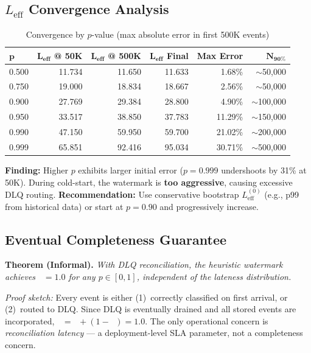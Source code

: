\documentclass[11pt,a4paper]{article}
\DeclareMathOperator{\Cimm}{C_{\text{imm}}}
\DeclareMathOperator{\Cev}{C_{\text{ev}}}
\newcommand{\Leff}{L_{\text{eff}}}
\begin{document}
\subsection{$\Leff$ Convergence Analysis}

\begin{table}[H]
\centering
\caption{Convergence by $p$-value (max absolute error in first 500K events)}
\label{tab:convergence}
\begin{tabular}{lrrrrr}
\toprule
$\bm{p}$ & $\mathbf{L_{\textbf{eff}}}$ \textbf{@ 50K} & $\mathbf{L_{\textbf{eff}}}$ \textbf{@ 500K} & $\mathbf{L_{\textbf{eff}}}$ \textbf{Final} & \textbf{Max Error} & $\mathbf{N_{90\%}}$ \\
\midrule
0.500 & 11.734 & 11.650 & 11.633 & 1.68\%  & $\sim$50,000 \\
0.750 & 19.000 & 18.834 & 18.667 & 2.56\%  & $\sim$50,000 \\
0.900 & 27.769 & 29.384 & 28.800 & 4.90\%  & $\sim$100,000 \\
0.950 & 33.517 & 38.850 & 37.783 & 11.29\% & $\sim$150,000 \\
0.990 & 47.150 & 59.950 & 59.700 & 21.02\% & $\sim$200,000 \\
0.999 & 65.851 & 92.416 & 95.034 & 30.71\% & $\sim$500,000 \\
\bottomrule
\end{tabular}
\end{table}

\textbf{Finding:} Higher $p$ exhibits larger initial error ($p{=}0.999$ undershoots by 31\% at 50K).
During cold-start, the watermark is \textbf{too aggressive}, causing excessive DLQ routing.
\textbf{Recommendation:} Use conservative bootstrap $L_{\text{eff}}^{(0)}$ (e.g., p99 from historical data) or start at $p{=}0.90$ and progressively increase.

\subsection{Eventual Completeness Guarantee}

\noindent\textbf{Theorem (Informal).}
\textit{With DLQ reconciliation, the heuristic watermark achieves $\Cev = 1.0$ for any $p \in [0, 1]$, independent of the lateness distribution.}

\vspace{4pt}
\noindent\textit{Proof sketch:} Every event is either (1)~correctly classified on first arrival, or (2)~routed to DLQ.
Since DLQ is eventually drained and all stored events are incorporated, $\Cev = \Cimm + (1 - \Cimm) = 1.0$.
The only operational concern is \textit{reconciliation latency} --- a deployment-level SLA parameter, not a completeness concern.
\end{document}

